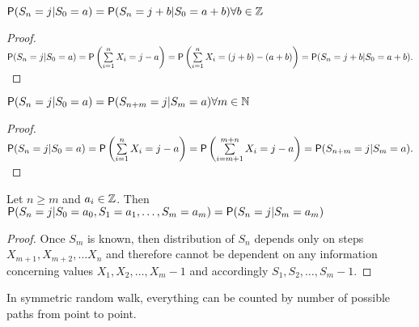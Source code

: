 \begin{lemma}\label{thm-spatial_homogeneity}
  $\operatorname{\textsf{P}}(S_n=j|S_0=a)=\operatorname{\textsf{P}}(S_n=j+b|S_0=a+b) \forall b \in \mathbb{Z}$
\end{lemma}
\begin{proof}
  $\pr(S_n=j|S_0=a)=\pr \left(\suma X_i=j-a\right)=\pr \left(\suma X_i=(j+b)-(a+b)\right)=\pr(S_n=j+b|S_0=a+b).$
\end{proof}

\begin{lemma}\label{thm-temporal_homogeneity}
  $\operatorname{\textsf{P}}(S_n=j|S_0=a)=\operatorname{\textsf{P}}(S_{n+m}=j|S_m=a) \forall m \in \mathbb{N}$
\end{lemma}
\begin{proof}
  $\pr(S_n=j|S_0=a)=\pr\left(\suma X_i=j-a \right)=\pr\left(\suma[i][m+1][m+n]X_i=j-a \right)=\pr(S_{n+m}=j|S_m=a).$
\end{proof}

\begin{lemma}\label{thm-markov_property}
  Let $n\geq m$ and $a_i \in \mathbb{Z}$. Then $\operatorname{\textsf{P}}(S_n=j|S_0=a_0, S_1=a_1, \ldots, S_m=a_m)=\operatorname{\textsf{P}}(S_n=j|S_m=a_m)$
\end{lemma}
\begin{proof}
  Once $S_m$ is known, then distribution of $S_n$ depends only on steps $X_{m+1}, X_{m+2}, \ldots X_n$ and therefore cannot be dependent on any information concerning values $X_1, X_2, \ldots, X_m-1$ and accordingly $S_1, S_2, \ldots, S_m-1.$
\end{proof}

\begin{rem}
  In symmetric random walk, everything can be counted by number of possible paths from point to point.
\end{rem}


